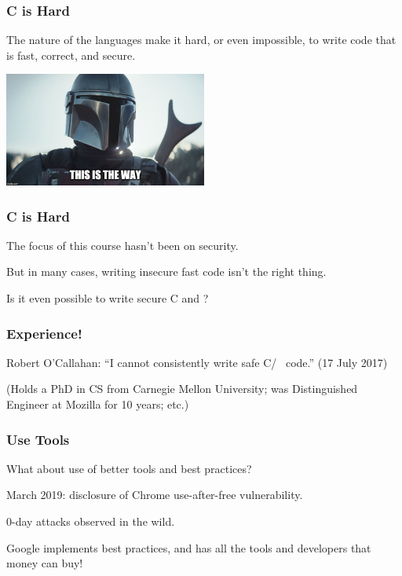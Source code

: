 \begin{frame}
\frametitle{C is Hard}

The nature of the languages make it hard, or even impossible, to write code that is fast, correct, and secure. 

\begin{center}
	\includegraphics[width=0.5\textwidth]{images/mando.jpg}
\end{center}

\end {frame}

\begin{frame}
\frametitle{C is Hard}
The focus of this course hasn't been on security. 

But in many cases, writing insecure fast code isn't the right thing. 

Is it even possible to write secure C and \CPP?

\end{frame}


\begin{frame}
\frametitle{Experience!}

Robert O'Callahan: ``I cannot consistently write safe C/\CPP~ code.'' (17 July 2017) 

(Holds a PhD in CS from Carnegie Mellon University; was Distinguished Engineer at Mozilla for 10 years; etc.)

\end{frame}


\begin{frame}
\frametitle{Use Tools}

What about use of better tools and best practices?

March 2019: disclosure of Chrome use-after-free vulnerability. 

0-day attacks observed in the wild.

Google implements best practices, and has all the tools and developers that
money can buy!

\end{frame}

